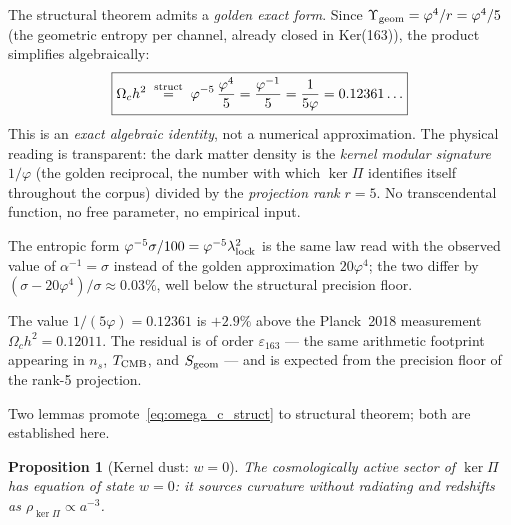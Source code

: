 \documentclass[twocolumn,10pt]{article}
\newcommand{\vp}{\varphi}
\newcommand{\Sgeom}{S_{\rm geom}}
\newcommand{\llock}{\lambda_{\rm lock}}
\newcommand{\kerPi}{\ker\Pi}
\newtheorem{proposition}[theorem]{Proposition}
\begin{document}
The structural theorem admits a \emph{golden exact form}.
Since $\Upsilon_{\rm geom}=\vp^4/r=\vp^4/5$ (the geometric entropy
per channel, already closed in Ker(163)), the product simplifies
algebraically:
\begin{equation}
  \boxed{
  \Omega_ch^2 \;\stackrel{\rm struct}{=}\;
  \vp^{-5}\,\frac{\vp^4}{5}
  = \frac{\vp^{-1}}{5}
  = \frac{1}{5\vp}
  = 0.12361\ldots
  }
  \label{eq:omega_c_struct}
\end{equation}
This is an \emph{exact algebraic identity}, not a numerical
approximation. The physical reading is transparent: the dark matter
density is the \emph{kernel modular signature} $1/\vp$ (the
golden reciprocal, the number with which $\ker\Pi$ identifies itself
throughout the corpus) divided by the \emph{projection rank} $r=5$.
No transcendental function, no free parameter, no empirical input.

The entropic form $\vp^{-5}\sigma/100 = \vp^{-5}\llock^2$ is the same
law read with the observed value of $\alpha^{-1}=\sigma$ instead of
the golden approximation $20\vp^4$; the two differ by
$(\sigma-20\vp^4)/\sigma \approx 0.03\%$, well below the structural
precision floor.

The value $1/(5\vp)=0.12361$ is $+2.9\%$ above the Planck~2018
measurement $\Omega_ch^2=0.12011$. The residual is of order
$\varepsilon_{163}$ — the same arithmetic footprint appearing in $n_s$,
$T_{\rm CMB}$, and $\Sgeom$ — and is expected from the precision floor
of the rank-5 projection.

Two lemmas promote~\eqref{eq:omega_c_struct} to structural theorem;
both are established here.

\begin{proposition}[Kernel dust: $w=0$]
\label{lem:w0}
The cosmologically active sector of $\kerPi$ has equation of state
$w=0$: it sources curvature without radiating and redshifts as
$\rho_{\kerPi}\propto a^{-3}$.
\end{proposition}
\end{document}
